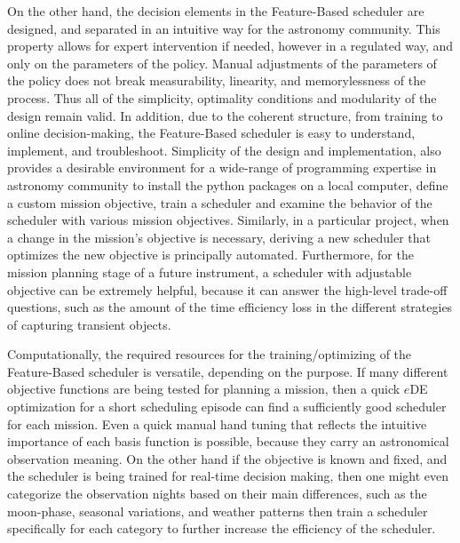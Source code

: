 \documentclass[12pt]{aastex62}
\theoremstyle{definition}
\begin{document}
On the other hand, the decision elements in the Feature-Based scheduler are designed, and separated in an intuitive way for the astronomy community. This property allows for expert intervention if needed, however in a regulated way, and only on the parameters of the policy. Manual adjustments of the parameters of the policy does not break measurability, linearity, and memorylessness of the process. Thus all of the simplicity, optimality conditions and modularity of the design remain valid. In addition, due to the coherent structure, from training to online decision-making, the Feature-Based scheduler is easy to understand, implement, and troubleshoot. Simplicity of the design and implementation, also provides a desirable environment for a wide-range of programming expertise in astronomy community to install the python packages on a local computer, define a custom mission objective, train a scheduler and examine the behavior of the scheduler with various mission objectives. Similarly, in a particular project, when a change in the mission's objective is necessary, deriving a new scheduler that optimizes the new objective is principally automated. Furthermore, for the mission planning stage of a future instrument, a scheduler with adjustable objective can be extremely helpful, because it can answer the high-level trade-off questions, such as the amount of the time efficiency loss in the different strategies of capturing transient objects.

Computationally, the required resources for the training/optimizing of the Feature-Based scheduler is versatile, depending on the purpose. If many different objective functions are being tested for planning a mission, then a quick $e$DE optimization for a short scheduling episode can find a sufficiently good scheduler for each mission. Even a quick manual hand tuning that reflects the intuitive importance of each basis function is possible, because they carry an astronomical observation meaning. On the other hand if the objective is known and fixed, and the scheduler is being trained for real-time decision making, then one might even categorize the observation nights based on their main differences, such as the moon-phase, seasonal variations, and weather patterns then train a scheduler specifically for each category to further increase the efficiency of the scheduler. 
\end{document}
